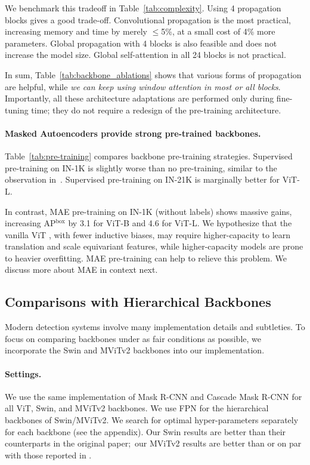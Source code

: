\documentclass[runningheads]{llncs}
\newcommand{\boxAP}{AP$^\text{box}$\xspace}
\begin{document}
We benchmark this tradeoff in Table~\ref{tab:complexity}.
Using 4 propagation blocks gives a good trade-off. Convolutional propagation is the most practical, increasing memory and time by merely $\leq$5\%, at a small cost of 4\% more parameters.
 Global propagation with 4 blocks is also feasible and does not increase the model size. Global self-attention in all 24 blocks is not practical.

In sum, Table~\ref{tab:backbone_ablations} shows that various forms of propagation are helpful, while \textit{we can keep using window attention in most or all blocks}.
 Importantly, all these architecture adaptations are performed only during fine-tuning time; they do not require a redesign of the pre-training architecture.

\paragraph{Masked Autoencoders provide strong pre-trained backbones.} Table~\ref{tab:pre-training} compares backbone pre-training strategies. Supervised pre-training on IN-1K is slightly worse than no pre-training, similar to the observation in~\cite{Ghiasi2021}. Supervised pre-training on IN-21K is marginally better for ViT-L.

In contrast, MAE \cite{He2021} pre-training on IN-1K (without labels) shows massive gains, increasing \boxAP by 3.1 for ViT-B and 4.6 for ViT-L. 
We hypothesize that the vanilla ViT \cite{Dosovitskiy2021}, with fewer inductive biases, may require higher-capacity to learn translation and scale equivariant features, while higher-capacity models are prone to heavier overfitting. MAE pre-training can help to relieve this problem. We discuss more about MAE in context next.

\subsection{Comparisons with Hierarchical Backbones} \label{subsec:vs_hier}

Modern detection systems involve many implementation details and subtleties. To focus on comparing backbones under as fair conditions as possible, we incorporate the Swin \cite{Liu2021} and MViTv2 \cite{Li2021a} backbones into our implementation.

\paragraph{Settings.} We use the same implementation of Mask R-CNN \cite{He2017} and Cascade Mask R-CNN \cite{Cai2019} for all ViT, Swin, and MViTv2 backbones. We use FPN for the hierarchical backbones of Swin/MViTv2. We search for optimal hyper-parameters separately for each backbone (see the appendix). Our Swin results are better than their counterparts in the original paper;\footnotemark~our MViTv2 results are better than or on par with those reported in \cite{Li2021a}.
\end{document}
